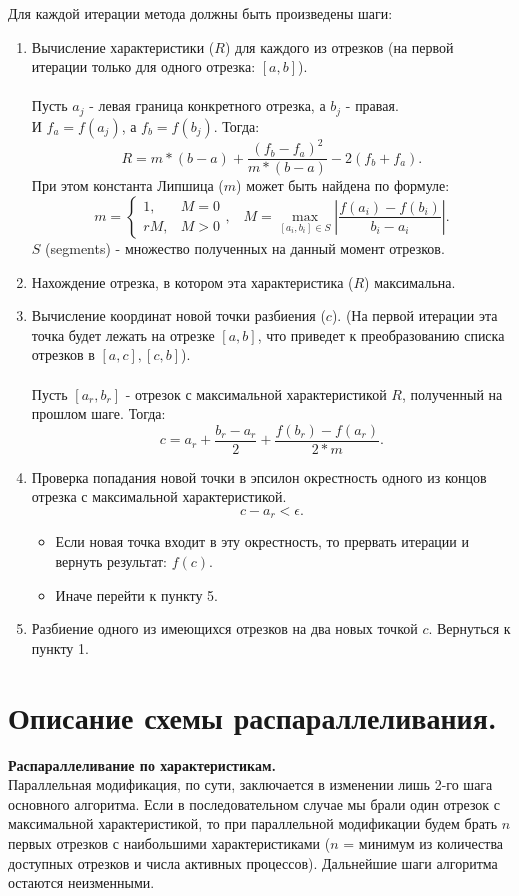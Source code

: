 \documentclass[14pt, a4paper]{extarticle}
\begin{document}
	\noindent Для каждой итерации метода должны быть произведены шаги:
	\begin{enumerate}
		\item Вычисление характеристики ($R$) для каждого из отрезков (на первой итерации только для одного отрезка: $[a,b]$).\\\\
		Пусть $a_j$ - левая граница конкретного отрезка, а $b_j$ - правая.\\
		И $f_a = f(a_j)$, а $f_b = f(b_j)$.
		Тогда:
		$$ R = m * (b - a) + \frac{(f_b - f_a)^2}{m * (b - a)} - 2(f_b + f_a). $$
		При этом константа Липшица ($m$) может быть найдена по формуле:
		$$ m = 
		\begin{cases}
				1, & M = 0 \\
				rM, & M > 0
		\end{cases},\;\;\;
		M = \max_{[a_i, b_i] \in S} \left| \frac{f(a_i) - f(b_i)}{b_i - a_i} \right|. $$
		$S$ (segments) - множество полученных на данный момент отрезков.
		\item Нахождение отрезка, в котором эта характеристика ($R$) максимальна.
		\item Вычисление координат новой точки разбиения ($c$). (На первой итерации эта точка будет лежать на отрезке $[a,b]$, что приведет к преобразованию списка отрезков в $[a,c], [c,b]$).\\\\
		Пусть $[a_r, b_r]$ - отрезок с максимальной характеристикой $R$, полученный на прошлом шаге. Тогда:
		$$ c = a_r + \frac{b_r - a_r}{2} + \frac{f(b_r) - f(a_r)}{2 * m}. $$
		\item Проверка попадания новой точки в эпсилон окрестность одного из концов отрезка с максимальной характеристикой.
		$$ c - a_r < \epsilon. $$
		\begin{itemize}
		    \item Если новая точка входит в эту окрестность, то прервать итерации и вернуть результат: $f(c)$.
		    \item Иначе перейти к пункту 5.
		\end{itemize}
		\item Разбиение одного из имеющихся отрезков на два новых точкой $c$. Вернуться к пункту 1.
	\end{enumerate}
	\newpage

	\section{Описание схемы распараллеливания.}
	\textbf{Распараллеливание по характеристикам.}\\
	Параллельная модификация, по сути, заключается в изменении лишь 2-го шага основного алгоритма. Если в последовательном случае мы брали один отрезок с максимальной характеристикой, то при параллельной модификации будем брать $n$ первых отрезков с наибольшими характеристиками ($n$ = минимум из количества доступных отрезков и числа активных процессов). Дальнейшие шаги алгоритма остаются неизменными.
\end{document}
